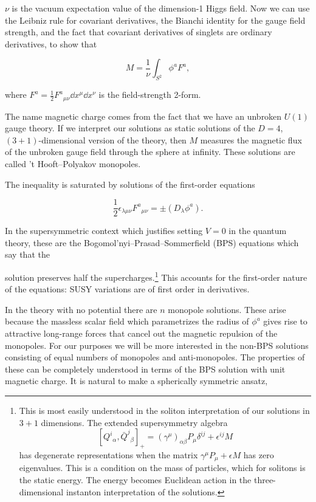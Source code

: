 $\nu$ is the vacuum expectation value of the dimension-1 Higgs field. Now we
can use the Leibniz rule for covariant derivatives, the Bianchi identity for the
gauge field strength, and the fact that covariant derivatives of singlets are
ordinary derivatives, to show that

\[
  M=\frac1\nu\int_{S^2}\phi^aF^a,
\]

where $F^a=\tfrac12F^a{}_{\mu\nu}\dd x^\mu\dd x^\nu$ is the field-strength
2-form.

The name magnetic charge comes from the fact that we have an unbroken $U(1)$
gauge theory. If we interpret our solutions as static solutions of the
$D=4$, $(3+1)$-dimensional version of the theory, then $M$ measures the magnetic flux
of the unbroken gauge field through the sphere at infinity. These solutions are
called 't Hooft--Polyakov monopoles.

The inequality is saturated by solutions of the first-order equations

\[
  \frac12\epsilon_{\lambda\mu\nu}F^a{}_{\mu\nu}
  =\pm(D_\lambda\phi^a).
\]

In the supersymmetric context which justifies setting $V=0$ in the quantum
theory, these are the Bogomol'nyi--Prasad--Sommerfield (BPS) equations which say
that the

solution preserves half the supercharges.\footnote[8]{This is most easily
understood in the soliton interpretation of our solutions in $3+1$ dimensions.
The extended supersymmetry algebra
\[
  [Q^i{}_\alpha,\bar Q^j{}_\beta]_+
  =(\gamma^\mu)_{\alpha\beta}P_\mu\delta^{ij}
  +\epsilon^{ij}M
\]
has degenerate representations when the matrix
$\gamma^\mu P_\mu+\epsilon M$ has zero eigenvalues. This is a condition on the
mass of particles, which for solitons is the static energy. The energy becomes
Euclidean action in the three-dimensional instanton interpretation of the
solutions.} This accounts for the first-order nature of the equations: SUSY
variations are of first order in derivatives.

In the theory with no potential there are $n$ monopole solutions. These arise
because the massless scalar field which parametrizes the radius of $\phi^a$ gives
rise to attractive long-range forces that cancel out the magnetic repulsion of
the monopoles. For our purposes we will be more interested in the non-BPS
solutions consisting of equal numbers of monopoles and anti-monopoles. The
properties of these can be completely understood in terms of the BPS solution
with unit magnetic charge. It is natural to make a spherically symmetric ansatz,

